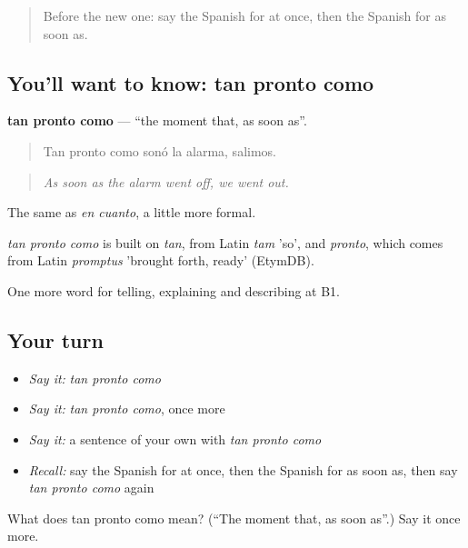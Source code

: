 \label{lesson:ES-C536-tan-pronto-como}



\begin{quote}
Before the new one: say the Spanish for at once, then the Spanish for as soon as.
\end{quote}

\subsection*{You'll want to know: tan pronto como}
\textbf{tan pronto como} — \textquotedblleft{}the moment that, as soon as\textquotedblright{}.

\begin{quote}
Tan pronto como sonó la alarma, salimos.
\end{quote}

\begin{quote}
\emph{As soon as the alarm went off, we went out.}
\end{quote}

The same as \emph{en cuanto}, a little more formal.

\begin{cousinweb}
\emph{tan pronto como} is built on \emph{tan}, from Latin \emph{tam} 'so', and \emph{pronto}, which comes from Latin \emph{promptus} 'brought forth, ready' (EtymDB).
\end{cousinweb}

\begin{grammarlens}[title={What you've built}]
One more word for telling, explaining and describing at B1.
\end{grammarlens}

\subsection*{Your turn}
\begin{itemize}
\raggedright
  \item \emph{Say it:} \emph{tan pronto como}
  \item \emph{Say it:} \emph{tan pronto como}, once more
  \item \emph{Say it:} a sentence of your own with \emph{tan pronto como}
  \item \emph{Recall:} say the Spanish for at once, then the Spanish for as soon as, then say \emph{tan pronto como} again
\end{itemize}

\begin{tcolorbox}[breakable,colback=teal!4,colframe=teal!35!black,title={Before you move on}]
What does tan pronto como mean? (\textquotedblleft{}The moment that, as soon as\textquotedblright{}.) Say it once more.
\end{tcolorbox}
